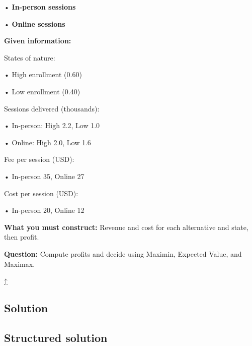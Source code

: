 \documentclass[11pt]{article}
\begin{document}
	• \textbf{In-person sessions}
	
	
	
	• \textbf{Online sessions}
	
	
	
	
	
	\textbf{Given information:}
	
	
	
	States of nature:
	
	
	
	• High enrollment (0.60)
	
	
	
	• Low enrollment (0.40)
	
	
	
	
	
	Sessions delivered (thousands):
	
	
	
	• In-person: High 2.2, Low 1.0
	
	
	
	• Online: High 2.0, Low 1.6
	
	
	
	
	
	Fee per session (USD):
	
	
	
	• In-person 35, Online 27
	
	
	
	
	
	Cost per session (USD):
	
	
	
	• In-person 20, Online 12
	
	
	
	
	
	
	\textbf{What you must construct:} Revenue and cost for each alternative and state, then profit.
	
	
	
	
	
	
	\textbf{Question:} Compute profits and decide using Maximin, Expected Value, and Maximax.
	
	\hyperref[problem3b-criteria]{↑}
	
	\subsection*{Solution}
	
	\label{problem3b-solution}\label{problem3b-criteria}
	
	\subsection*{Structured solution}
	
\end{document}
